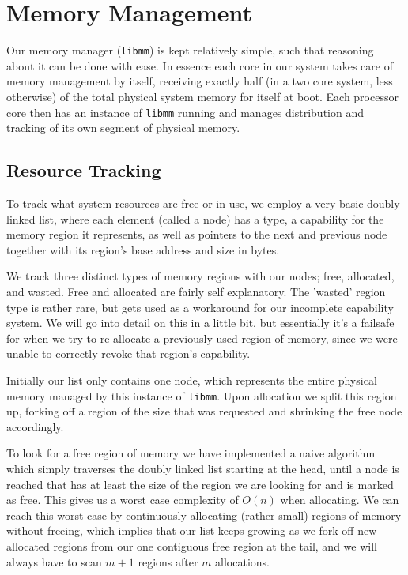 \section{Memory Management}\label{s:memory-management}

Our memory manager (\texttt{libmm}) is kept relatively simple, such that 
reasoning about it can be done with ease. In essence each core in our system 
takes care of memory management by itself, receiving exactly half (in a two 
core system, less otherwise) of the total physical system memory for itself at 
boot. Each processor core then has an instance of \texttt{libmm} running and 
manages distribution and tracking of its own segment of physical memory.

\subsection{Resource Tracking}\label{ss:res-tracking}

To track what system resources are free or in use, we employ a very basic 
doubly linked list, where each element (called a node) has a type, 
a capability for the memory region it represents, as well 
as pointers to the next and previous node together with its region's base 
address and size in bytes.
\medskip

We track three distinct types of memory regions with our nodes; free, 
allocated, and wasted. Free and allocated are fairly self explanatory. The 
'wasted' region type is rather rare, but gets used as a workaround for our 
incomplete capability system. We will go into detail on this in a little bit, 
but essentially it's a failsafe for when we try to re-allocate a previously 
used region of memory, since we were unable to correctly revoke that region's 
capability.	
\medskip

Initially our list only contains one node, which represents the entire physical 
memory managed by this instance of \texttt{libmm}. Upon allocation we split 
this region up, forking off a region of the size that was requested and 
shrinking the free node accordingly.
\medskip

To look for a free region of memory we have implemented a naive algorithm which 
simply traverses the doubly linked list starting at the head, until a node is 
reached that has at least the size of the region we are looking for and is 
marked as free. This gives us a worst case complexity of $O(n)$ when 
allocating. We can reach this worst case by continuously allocating (rather 
small) regions of memory without freeing, which implies that our list keeps 
growing as we fork off new allocated regions from our one contiguous free 
region at the tail, and we will always have to scan $m + 1$ regions after $m$ 
allocations.
\medskip

